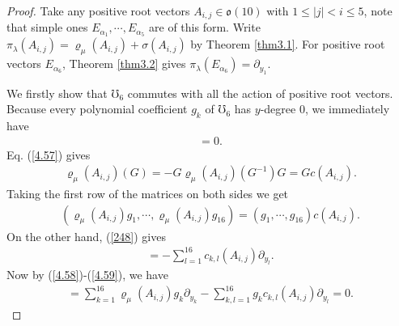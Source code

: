 \documentclass[12pt]{article}
\numberwithin{equation}{section}
\theoremstyle{definition}
\theoremstyle{remark}
\begin{document}
\begin{proof}
	Take any positive root vectors $A_{i,j}\in\mathfrak{o}(10)$ with $1\leqslant |j| <i\leqslant 5$, note that simple ones $E_{\alpha_1},\cdots,E_{\alpha_5}$ are of this form. Write $\pi_{\lambda}(A_{i,j})=\varrho_{\mu}(A_{i,j})+\sigma(A_{i,j})$ by Theorem \ref{thm3.1}. For positive root vectors $E_{\alpha_6}$, Theorem \ref{thm3.2} gives $\pi_{\lambda}(E_{\alpha_6})=\partial_{y_1}$.
	
	We firstly show that $\mho_6$ commutes with all the action of positive root vectors. Because every polynomial coefficient $g_k$ of $\mho_6$ has $y$-degree $0$, we immediately have
	\begin{eqnarray}
		[\partial_{y_1},\mho_6]=0.
	\end{eqnarray}
	Eq. (\ref{4.57}) gives
	\begin{eqnarray}
		\varrho_{\mu}(A_{i,j})(G)=-G\varrho_{\mu}(A_{i,j})(G^{-1})G=Gc(A_{i,j}).
	\end{eqnarray}
	Taking the first row of the matrices on both sides we get
	\begin{eqnarray}
		(\varrho_{\mu}(A_{i,j})g_1,\cdots,\varrho_{\mu}(A_{i,j})g_{16})=(g_1,\cdots,g_{16})c(A_{i,j}).\label{4.58}
	\end{eqnarray}
	On the other hand, (\ref{248}) gives
	\begin{align}
		[\sigma({A_{i,j}}),\partial_{y_k}]=-\sum_{l=1}^{16}c_{k,l}(A_{i,j})\partial_{y_l}. \label{4.59}
	\end{align}
	Now by (\ref{4.58})-(\ref{4.59}), we have
	\begin{eqnarray}
		[\pi_{\lambda}(A_{i,j}),\mho_6]=\sum_{k=1}^{16}\varrho_{\mu}(A_{i,j})g_k\partial_{y_k}-\sum_{k,l=1}^{16}g_kc_{k,l}(A_{i,j})\partial_{y_l}=0.
	\end{eqnarray}
	

\end{proof}
\end{document}
